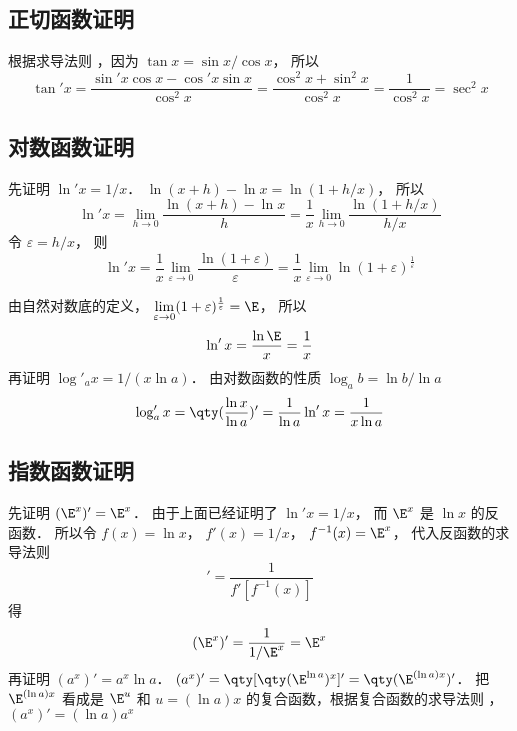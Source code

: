 \subsection{正切函数证明}
根据求导法则%
，因为 $\tan x = \sin x/\cos x$， 所以
\begin{equation}
\tan' x = \frac{\sin' x \cos x - \cos' x\sin x}{\cos^2 x} = \frac{\cos^2x + \sin^2 x}{\cos^2 x} = \frac{1}{\cos ^2 x} = \sec ^2 x
\end{equation}
\subsection{对数函数证明}
先证明 $\ln' x = {1}/{x}$．  $\ln(x + h) - \ln x = \ln(1 + h/x)$， 所以
 \begin{equation}
\ln 'x = \lim_{h \to 0} \frac{\ln(x + h) - \ln x}{h} = \frac{1}{x} \lim_{h \to 0} \frac{\ln(1 + h/x)}{h/x}
\end{equation}
令 $\varepsilon  = h/x$， 则
\begin{equation}
\ln' x = \frac{1}{x} \lim_{\varepsilon  \to 0} \frac{\ln(1 + \varepsilon)}{\varepsilon } = \frac{1}{x} \lim_{\varepsilon  \to 0} \ln(1 + \varepsilon)^{\frac{1}{\varepsilon }} 
\end{equation}
 
由自然对数底的定义， $\lim\limits_{\varepsilon  \to 0} (1 + \varepsilon)^{\frac{1}{\varepsilon }} = \E$， 所以
 \begin{equation}
\ln 'x = \frac{\ln \E}{x} = \frac{1}{x}
\end{equation}
再证明 $\log'_a x = {1}/(x\ln a)$． 
由对数函数的性质 $\log_a b = \ln b/\ln a$
\begin{equation}
\log'_a x = \qty(\frac{\ln x}{\ln a})' = \frac{1}{\ln a}\ln' x = \frac{1}{x\ln a}
\end{equation}

\subsection{指数函数证明}
先证明 $(\E^x)' = \E^x$． 
由于上面已经证明了 $ \ln'x = 1/x$， 而 $\E^x$ 是 $\ln x$ 的反函数． 所以令 $f(x) = \ln x$， $f'(x) = 1/x$，  $f^{ - 1} (x) = \E^x$， 代入反函数的求导法则%
\begin{equation}
[f^{-1} (x)]' = \frac{1}{f'[f^{ - 1}(x)]}
\end{equation} 
得
\begin{equation}
(\E^x)' = \frac{1}{1/\E^x} = \E^x
\end{equation}
再证明 $(a^x)' = a^x \ln a$．  $(a^x)' = \qty[ \qty( \E^{\ln a} )^x ]' = \qty( \E^{(\ln a) x} )'$． 把 $\E^{(\ln a) x}$ 看成是 $\E^u$ 和 $u = (\ln a) x$ 的复合函数，根据复合函数的求导法则 ，$(a^x)' = (\ln a) a^x$ 



















